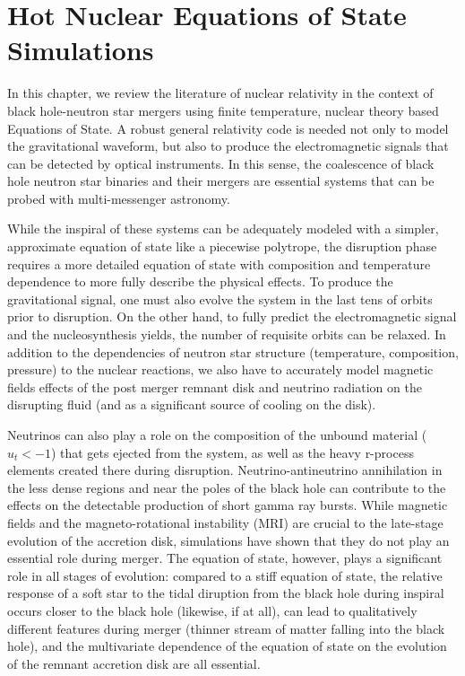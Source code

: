 \chapter{Hot Nuclear Equations of State Simulations}
\label{chap:chapter-4}

In this chapter, we review the literature of nuclear relativity in the context of black hole-neutron star mergers using finite temperature, nuclear theory based Equations of State.  A robust general relativity code is needed not only to model the gravitational waveform, but also to produce the electromagnetic signals that can be detected by optical instruments.  In this sense, the coalescence of black hole neutron star binaries and their mergers are essential systems that can be probed with multi-messenger astronomy.  

While the inspiral of these systems can be adequately modeled with a simpler, approximate equation of state like a piecewise polytrope, the disruption phase requires a more detailed equation of state with composition and temperature dependence to more fully describe the physical effects.  To produce the gravitational signal, one must also evolve the system in the last tens of orbits prior to disruption.  On the other hand, to fully predict the electromagnetic signal and the nucleosynthesis yields, the number of requisite orbits can be relaxed.  In addition to the dependencies of neutron star structure (temperature, composition, pressure) to the nuclear reactions, we also have to accurately model magnetic fields effects of the post merger remnant disk and neutrino radiation on the disrupting fluid (and as a significant source of cooling on the disk).

Neutrinos can also play a role on the composition of the unbound material ($u_t < -1$) that gets ejected from the system, as well as the heavy r-process elements created there during disruption. Neutrino-antineutrino annihilation in the less dense regions and near the poles of the black hole can contribute to the effects on the detectable production of short gamma ray bursts.  While magnetic fields and the magneto-rotational instability (MRI) are crucial to the late-stage evolution of the accretion disk, simulations have shown that they do not play an essential role during merger.  The equation of state, however, plays a significant role in all stages of evolution: compared to a stiff equation of state, the relative response of a soft star to the tidal diruption from the black hole during inspiral occurs closer to the black hole (likewise, if at all), can lead to qualitatively different features during merger (thinner stream of matter falling into the black hole), and the multivariate dependence of the equation of state on the evolution of the remnant accretion disk are all essential.

